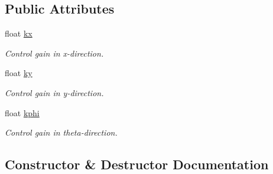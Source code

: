 \subsection*{Public Attributes}
\begin{DoxyCompactItemize}
\item 
\mbox{\label{structLyapunovController_1_1LyapunovParameter_af45ecc57706f7d6b9d1fcdf2fd355fc2}} 
float \hyperlink{structLyapunovController_1_1LyapunovParameter_af45ecc57706f7d6b9d1fcdf2fd355fc2}{kx}
\begin{DoxyCompactList}\small\item\em Control gain in x-\/direction. \end{DoxyCompactList}\item 
\mbox{\label{structLyapunovController_1_1LyapunovParameter_afcdfaafefdbafdc6cca6b2db8a45fe3a}} 
float \hyperlink{structLyapunovController_1_1LyapunovParameter_afcdfaafefdbafdc6cca6b2db8a45fe3a}{ky}
\begin{DoxyCompactList}\small\item\em Control gain in y-\/direction. \end{DoxyCompactList}\item 
\mbox{\label{structLyapunovController_1_1LyapunovParameter_a823275a2d5ddd96019b3d69ea327c95c}} 
float \hyperlink{structLyapunovController_1_1LyapunovParameter_a823275a2d5ddd96019b3d69ea327c95c}{kphi}
\begin{DoxyCompactList}\small\item\em Control gain in theta-\/direction. \end{DoxyCompactList}\end{DoxyCompactItemize}


\subsection{Constructor \& Destructor Documentation}
\mbox{\label{structLyapunovController_1_1LyapunovParameter_adb9af92d34ab58d439388000eab5deeb}} 
